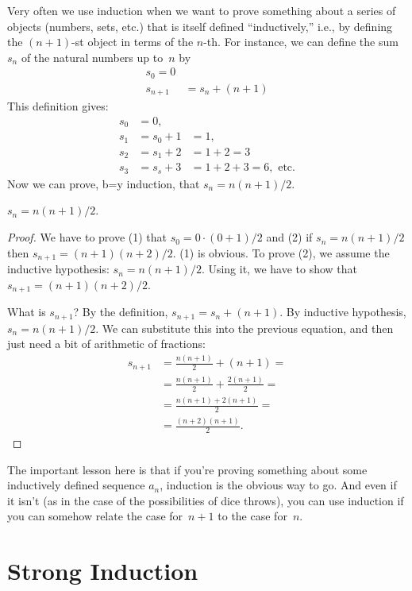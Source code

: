 \documentclass[../../../include/open-logic-section]{subfiles}
\begin{document}
Very often we use induction when we want to prove something about a
series of objects (numbers, sets, etc.) that is itself defined
``inductively,'' i.e., by defining the $(n+1)$-st object in terms of
the $n$-th.  For instance, we can define the sum~$s_n$ of the natural
numbers up to~$n$ by
\begin{align*}
  s_0 = 0\\
  s_{n+1} & = s_n + (n+1)
\end{align*}
This definition gives:
\begin{align*}
  s_0 & = 0,\\
  s_1 & = s_0 + 1 & = 1,\\
  s_2 & = s_1 + 2 & = 1 + 2 = 3\\
  s_3 & = s_s + 3 & = 1 + 2 + 3 = 6, \text{ etc.}
\end{align*}
Now we can prove, b=y induction, that $s_n = n(n+1)/2$.

\begin{prop}
  $s_n = n(n+1)/2$.
\end{prop}

\begin{proof}
  We have to prove (1) that $s_0 = 0\cdot(0 + 1)/2$ and (2) if $s_n =
  n(n+1)/2$ then $s_{n+1} = (n+1)(n+2)/2$.  (1) is obvious. To prove
  (2), we assume the inductive hypothesis: $s_n = n(n+1)/2$. Using it,
  we have to show that $s_{n+1} = (n+1)(n+2)/2$.

  What is $s_{n+1}$?  By the definition, $s_{n+1} = s_n + (n+1)$.  By
  inductive hypothesis, $s_n = n(n+1)/2$. We can substitute this into
  the previous equation, and then just need a bit of arithmetic of
  fractions:
  \begin{align*}
    s_{n+1} & = \frac{n(n+1)}{2} + (n+1) = {}\\
    & = \frac{n(n+1)}{2} + \frac{2(n+1)}{2} = {}\\
    & = \frac{n(n+1) + 2(n+1)}{2} = {}\\
    & = \frac{(n+2)(n+1)}{2}.
  \end{align*}
\end{proof}

The important lesson here is that if you're proving something about
some inductively defined sequence $a_n$, induction is the obvious way
to go. And even if it isn't (as in the case of the possibilities of
dice throws), you can use induction if you can somehow relate the case
for~$n+1$ to the case for~$n$.

\section{Strong Induction}
\end{document}
